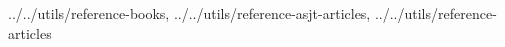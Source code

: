 \nocite{BGR14, Rub19}



{
    ../../utils/reference-books,
    ../../utils/reference-asjt-articles,
    ../../utils/reference-articles
}
\vspace{8mm}

